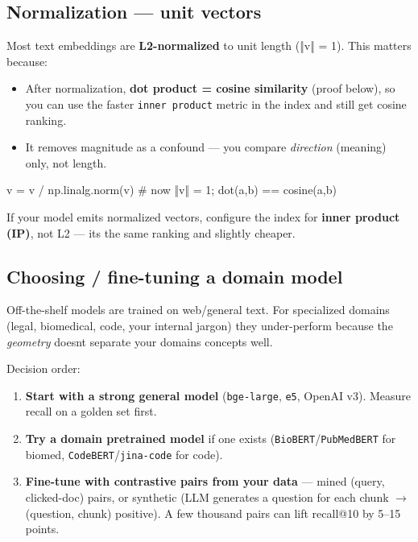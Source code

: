 \documentclass[11pt]{article}
\providecommand{\tightlist}{\setlength{\itemsep}{1pt}\setlength{\parskip}{0pt}}
\newenvironment{Shaded}{\begin{snugshade}}{\end{snugshade}}
\newcommand{\CommentTok}[1]{\textcolor[rgb]{0.48,0.49,0.49}{#1}}
\newcommand{\NormalTok}[1]{\textcolor[rgb]{0.81,0.81,0.76}{#1}}
\newcommand{\OperatorTok}[1]{\textcolor[rgb]{0.81,0.81,0.76}{#1}}
\begin{document}
\subsection{Normalization --- unit vectors}\label{normalization--unit-vectors}

Most text embeddings are \textbf{L2-normalized} to unit length (‖v‖ = 1). This matters because:

\begin{itemize}
\tightlist
\item
  After normalization, \textbf{dot product = cosine similarity} (proof below), so you can use the faster \texttt{inner\ product} metric in the index and still get cosine ranking.
\item
  It removes magnitude as a confound --- you compare \emph{direction} (meaning) only, not length.
\end{itemize}


\begin{Shaded}
\begin{Highlighting}[]
\NormalTok{v }\OperatorTok{=}\NormalTok{ v }\OperatorTok{/}\NormalTok{ np.linalg.norm(v)   }\CommentTok{\# now ‖v‖ = 1; dot(a,b) == cosine(a,b)}
\end{Highlighting}
\end{Shaded}

If your model emits normalized vectors, configure the index for \textbf{inner product (IP)}, not L2 --- it\textquotesingle s the same ranking and slightly cheaper.

\subsection{Choosing / fine-tuning a domain model}\label{choosing--fine-tuning-a-domain-model}

Off-the-shelf models are trained on web/general text. For specialized domains (legal, biomedical, code, your internal jargon) they under-perform because the \emph{geometry} doesn\textquotesingle t separate your domain\textquotesingle s concepts well.

Decision order:

\begin{enumerate}
\def\labelenumi{\arabic{enumi}.}
\tightlist
\item
  \textbf{Start with a strong general model} (\texttt{bge-large}, \texttt{e5}, OpenAI v3). Measure recall on a golden set first.
\item
  \textbf{Try a domain pretrained model} if one exists (\texttt{BioBERT}/\texttt{PubMedBERT} for biomed, \texttt{CodeBERT}/\texttt{jina-code} for code).
\item
  \textbf{Fine-tune with contrastive pairs from your data} --- mined (query, clicked-doc) pairs, or synthetic (LLM generates a question for each chunk \(\rightarrow\) (question, chunk) positive). A few thousand pairs can lift recall@10 by 5--15 points.
\end{enumerate}
\end{document}
